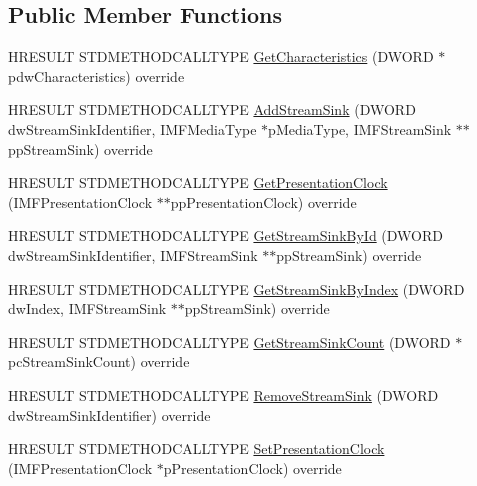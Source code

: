 \subsection*{Public Member Functions}
\begin{DoxyCompactItemize}
\item 
H\+R\+E\+S\+U\+LT S\+T\+D\+M\+E\+T\+H\+O\+D\+C\+A\+L\+L\+T\+Y\+PE \hyperlink{class_custom_media_sink_a3371c3cd571170eda3eae3c943b0be54}{Get\+Characteristics} (D\+W\+O\+RD $\ast$pdw\+Characteristics) override
\item 
H\+R\+E\+S\+U\+LT S\+T\+D\+M\+E\+T\+H\+O\+D\+C\+A\+L\+L\+T\+Y\+PE \hyperlink{class_custom_media_sink_a3d925ae017fe43fb4458481e01096dea}{Add\+Stream\+Sink} (D\+W\+O\+RD dw\+Stream\+Sink\+Identifier, I\+M\+F\+Media\+Type $\ast$p\+Media\+Type, I\+M\+F\+Stream\+Sink $\ast$$\ast$pp\+Stream\+Sink) override
\item 
H\+R\+E\+S\+U\+LT S\+T\+D\+M\+E\+T\+H\+O\+D\+C\+A\+L\+L\+T\+Y\+PE \hyperlink{class_custom_media_sink_a1ec4f87cc525d122284f7e5952d6718e}{Get\+Presentation\+Clock} (I\+M\+F\+Presentation\+Clock $\ast$$\ast$pp\+Presentation\+Clock) override
\item 
H\+R\+E\+S\+U\+LT S\+T\+D\+M\+E\+T\+H\+O\+D\+C\+A\+L\+L\+T\+Y\+PE \hyperlink{class_custom_media_sink_a64e8c8a69767bff7b059f2f8161ff654}{Get\+Stream\+Sink\+By\+Id} (D\+W\+O\+RD dw\+Stream\+Sink\+Identifier, I\+M\+F\+Stream\+Sink $\ast$$\ast$pp\+Stream\+Sink) override
\item 
H\+R\+E\+S\+U\+LT S\+T\+D\+M\+E\+T\+H\+O\+D\+C\+A\+L\+L\+T\+Y\+PE \hyperlink{class_custom_media_sink_abde0c9f0bba7e82aef0f42c0203841a5}{Get\+Stream\+Sink\+By\+Index} (D\+W\+O\+RD dw\+Index, I\+M\+F\+Stream\+Sink $\ast$$\ast$pp\+Stream\+Sink) override
\item 
H\+R\+E\+S\+U\+LT S\+T\+D\+M\+E\+T\+H\+O\+D\+C\+A\+L\+L\+T\+Y\+PE \hyperlink{class_custom_media_sink_a6256ef622776d99e0849573d848c138f}{Get\+Stream\+Sink\+Count} (D\+W\+O\+RD $\ast$pc\+Stream\+Sink\+Count) override
\item 
H\+R\+E\+S\+U\+LT S\+T\+D\+M\+E\+T\+H\+O\+D\+C\+A\+L\+L\+T\+Y\+PE \hyperlink{class_custom_media_sink_a4b2077f51df195b13c27d48d234db590}{Remove\+Stream\+Sink} (D\+W\+O\+RD dw\+Stream\+Sink\+Identifier) override
\item 
H\+R\+E\+S\+U\+LT S\+T\+D\+M\+E\+T\+H\+O\+D\+C\+A\+L\+L\+T\+Y\+PE \hyperlink{class_custom_media_sink_ac791f3dc05f260f2c3eef55548fdd32c}{Set\+Presentation\+Clock} (I\+M\+F\+Presentation\+Clock $\ast$p\+Presentation\+Clock) override
\item 

\end{DoxyCompactItemize}
